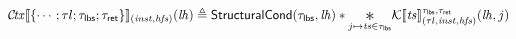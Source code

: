 \documentclass{standalone}
\begin{document}
\flushleft


\[
  \CTXvalid \llbracket \{ \cdots; \tau l; \tau_{\K{lbs}}; \tau_{\K{ret}} \} \rrbracket_{(\V{inst},\V{hfs})}(\V{lh})
  \triangleq
    \K{StructuralCond}(\tau_{\K{lbs}},\V{lh}) \ast
    \displaystyle \underset{j\mapsto\V{ts} \in \tau_{\K{lbs}}}{\Conv}\CONTvalid\llbracket \V{ts} \rrbracket_{(\tau l, \V{inst}, \V{hfs})}^{\tau_{\K{lbs}}, \tau_{\K{ret}}}(\V{lh},j)
\]
\end{document}
